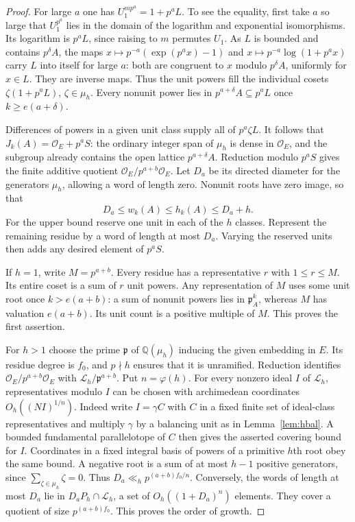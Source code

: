 \documentclass[11pt,letterpaper]{article}
\theoremstyle{definition}
\numberwithin{equation}{section}
\begin{document}
\begin{proof}
For large $a$ one has $U_1^{mp^a}=1+p^aL$. To see the equality,
first take $a$ so large that $U_1^{p^a}$ lies in the domain of the
logarithm and exponential isomorphisms. Its logarithm is $p^a L$,
since raising to $m$ permutes $U_1$. As $L$ is bounded and contains
$p^\delta A$, the maps $x\mapsto p^{-a}(\exp(p^a x)-1)$ and
$x\mapsto p^{-a}\log(1+p^a x)$ carry $L$ into itself for large $a$:
both are congruent to $x$ modulo $p^\delta A$, uniformly for $x\in L$.
They are inverse maps. Thus the unit powers fill the individual cosets
$\zeta(1+p^a L)$, $\zeta\in\mu_h$. Every nonunit power lies in
$p^{a+\delta}A\subseteq p^aL$ once $k\ge e(a+\delta)$.

Differences of powers in a given unit class supply all of $p^a\zeta L$.
It follows that $J_k(A)=\mathcal O_E+p^a S$: the ordinary integer
span of $\mu_h$ is dense in $\mathcal O_E$, and the subgroup already
contains the open lattice $p^{a+\delta}A$. Reduction modulo $p^a S$
gives the finite additive quotient $\mathcal O_E/p^{a+b}\mathcal O_E$.
Let $D_a$ be its directed diameter for the generators $\mu_h$, allowing
a word of length zero. Nonunit roots have zero image, so that
\[
                    D_a\le w_k(A)\le h_k(A)\le D_a+h .
\]
For the upper bound reserve one unit in each of the $h$ classes.
Represent the remaining residue by a word of length at most $D_a$.
Varying the reserved units then adds any desired element of $p^a S$.

If $h=1$, write $M=p^{a+b}$. Every residue has a representative
$r$ with $1\le r\le M$. Its entire coset is a sum of $r$ unit powers.
Any representation of $M$ uses some unit root once $k>e(a+b)$:
a sum of nonunit powers lies in $\mathfrak p_A^k$, whereas $M$
has valuation $e(a+b)$. Its unit count is a positive multiple of $M$.
This proves the first assertion.

For $h>1$ choose the prime $\mathfrak p$ of
$\mathbb Q(\mu_h)$ inducing the given embedding in $E$. Its residue
degree is $f_0$, and $p\nmid h$ ensures that it is unramified.
Reduction identifies $\mathcal O_E/p^{a+b}\mathcal O_E$ with
$\mathcal L_h/\mathfrak p^{a+b}$. Put $n=\varphi(h)$.
For every nonzero ideal $I$ of $\mathcal L_h$, representatives
modulo $I$ can be chosen with archimedean coordinates
$O_h((NI)^{1/n})$. Indeed write $I=\gamma C$ with $C$ in a fixed
finite set of ideal-class representatives and multiply $\gamma$ by
a balancing unit as in Lemma~\ref{lem:hbal}. A bounded fundamental
parallelotope of $C$ then gives the asserted covering bound for $I$.
Coordinates in a fixed integral basis of powers of a primitive
$h$th root obey the same bound. A negative root is a sum of at most
$h-1$ positive generators, since $\sum_{\zeta\in\mu_h}\zeta=0$.
Thus $D_a\ll_h p^{(a+b)f_0/n}$. Conversely, the words of length
at most $D_a$ lie in $D_aP_h\cap\mathcal L_h$, a set of
$O_h((1+D_a)^n)$ elements. They cover a quotient of size
$p^{(a+b)f_0}$. This proves the order of growth.


\end{proof}
\end{document}

